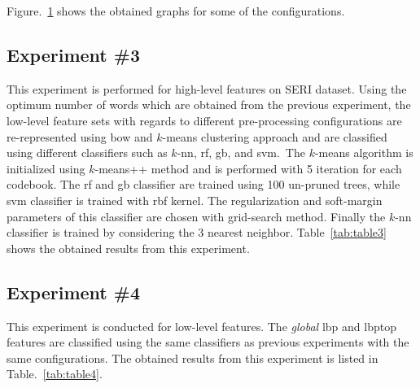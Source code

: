 


Figure.~\ref{fig:RBOW} shows the obtained graphs for some of the configurations. \\

\begin{figure}[t]
  \caption{}
  \label{fig:RBOW}
\end{figure}
 
\subsection{Experiment \#3}\label{subsec:exp3}
This experiment is performed for high-level features on SERI dataset. 
Using the optimum number of words which are obtained from the previous experiment, the low-level feature sets with regards to different pre-processing configurations are re-represented using \ac{bow} and $k$-means clustering approach and are classified using different classifiers such as $k$-\ac{nn}, \ac{rf}, \ac{gb}, and \ac{svm}.\
The $k$-means algorithm is initialized using $k$-means++ method and is performed with 5 iteration for each codebook.
The \ac{rf} and \ac{gb} classifier are trained using 100 un-pruned trees, while \ac{svm} classifier is trained with \ac{rbf} kernel. 
The regularization and soft-margin parameters of this classifier are chosen with grid-search method.
Finally the $k$-\ac{nn} classifier is trained by considering the 3 nearest neighbor.
Table~\ref{tab:table3} shows the obtained results from this experiment.\\




\subsection{Experiment \#4}\label{subsec:exp4}
This experiment is conducted for low-level features.
The \emph{global} \ac{lbp} and \ac{lbptop} features are classified using the same classifiers as previous experiments with the same configurations.
The obtained results from this experiment is listed in Table.~\ref{tab:table4}.\\


  


